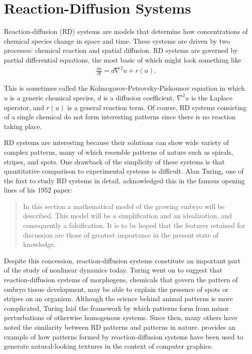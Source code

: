 \chapter{Reaction-Diffusion Systems}

	Reaction-diffusion (RD) systems are models that determine how concentrations of chemical species change in space and time. These systems are driven by two processes: chemical reaction and spatial diffusion. RD systems are governed by partial differential equations, the most basic of which might look something like
	\begin{align}
		\frac{\partial u}{\partial t} = d \nabla^2 u + r(u).
		\label{eq:KPP}
	\end{align}

This is sometimes called the Kolmogorov-Petrovsky-Piskounov equation in which $u$ is a generic chemical species, $d$ is a diffusion coefficient, $\nabla^2 u$ is the Laplace operator, and $r(u)$ is a general reaction term. Of course, RD systems consisting of a single chemical do not form interesting patterns since there is no reaction taking place.

	RD systems are interesting because their solutions can show wide variety of complex patterns, many of which resemble patterns of nature such as spirals, stripes, and spots. One drawback of the simplicity of these systems is that quantitative comparison to experimental systems is difficult. Alan Turing, one of the first to study RD systems in detail, acknowledged this in the famous opening lines of his 1952 paper:
%
\begin{quote}
In this section a mathematical model of the growing embryo will be described. This model will be a simplification and an idealization, and consequently a falsification. It is to be hoped that the features retained for discussion are those of greatest importance in the present state of knowledge.
\end{quote}
%
	Despite this concession, reaction-diffusion systems constitute an important part of the study of nonlinear dynamics today. Turing went on to suggest that reaction-diffusion systems of morphogens, chemicals that govern the pattern of embryo tissue development, may be able to explain the presence of spots or stripes on an organism. Although the science behind animal patterns is more complicated, Turing laid the framework by which patterns form from minor perturbations of otherwise homogenous systems. Since then, many others have noted the similarity between RD patterns and patterns in nature.  provides an example of how patterns formed by reaction-diffusion systems have been used to generate natural-looking textures in the context of computer graphics.

